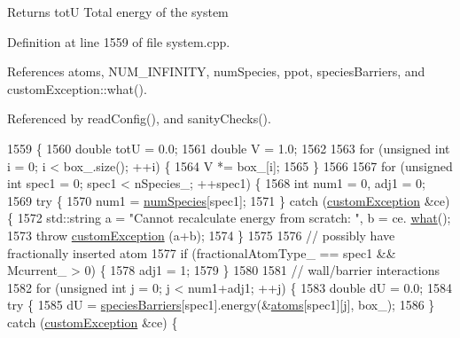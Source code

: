 \begin{DoxyReturn}{Returns}
tot\-U Total energy of the system 
\end{DoxyReturn}


Definition at line 1559 of file system.\-cpp.



References atoms, N\-U\-M\-\_\-\-I\-N\-F\-I\-N\-I\-T\-Y, num\-Species, ppot, species\-Barriers, and custom\-Exception\-::what().



Referenced by read\-Config(), and sanity\-Checks().


\begin{DoxyCode}
1559                                        \{
1560     \textcolor{keywordtype}{double} totU = 0.0;
1561     \textcolor{keywordtype}{double} V = 1.0;
1562 
1563     \textcolor{keywordflow}{for} (\textcolor{keywordtype}{unsigned} \textcolor{keywordtype}{int} i = 0; i < box\_.size(); ++i) \{
1564         V *= box\_[i];
1565     \}
1566 
1567     \textcolor{keywordflow}{for} (\textcolor{keywordtype}{unsigned} \textcolor{keywordtype}{int} spec1 = 0; spec1 < nSpecies\_; ++spec1) \{
1568         \textcolor{keywordtype}{int} num1 = 0, adj1 = 0;
1569         \textcolor{keywordflow}{try} \{
1570             num1 = \hyperlink{classsim_system_a9eea865e6dc1cff377b1e79c4d9c23f0}{numSpecies}[spec1];
1571         \} \textcolor{keywordflow}{catch} (\hyperlink{classcustom_exception}{customException} &ce) \{
1572             std::string a = \textcolor{stringliteral}{"Cannot recalculate energy from scratch: "}, b = ce.
      \hyperlink{classcustom_exception_aeb6ab5848b038adfc68fde86a512f691}{what}();
1573             \textcolor{keywordflow}{throw} \hyperlink{classcustom_exception}{customException} (a+b);
1574         \}
1575 
1576         \textcolor{comment}{// possibly have fractionally inserted atom}
1577         \textcolor{keywordflow}{if} (fractionalAtomType\_ == spec1 && Mcurrent\_ > 0) \{
1578             adj1 = 1;
1579         \}
1580 
1581         \textcolor{comment}{// wall/barrier interactions}
1582         \textcolor{keywordflow}{for} (\textcolor{keywordtype}{unsigned} \textcolor{keywordtype}{int} j = 0; j < num1+adj1; ++j) \{
1583             \textcolor{keywordtype}{double} dU = 0.0;
1584             \textcolor{keywordflow}{try} \{
1585                 dU = \hyperlink{classsim_system_a5ae652ff4519f39c3862abae32a9581b}{speciesBarriers}[spec1].energy(&\hyperlink{classsim_system_a90421b19082f7fb8fc23b7264b1161e4}{atoms}[spec1][j], box\_);
1586             \} \textcolor{keywordflow}{catch} (\hyperlink{classcustom_exception}{customException} &ce) \{

\end{DoxyCode}
